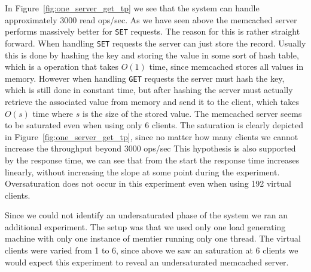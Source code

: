 \documentclass[11pt,a4paper]{article}
\begin{document}
%
In Figure~\ref{fig:one_server_get_tp} we see that the system can handle approximately 3000 read ops/sec.
%
As we have seen above the memcached server performs massively better for \texttt{SET} requests.
%
The reason for this is rather straight forward.
%
When handling \texttt{SET} requests the server can just store the record.
%
Usually this is done by hashing the key and storing the value in some sort of hash table, which is a operation that takes $O(1)$ time, since memcached stores all values in memory.
%
However when handling \texttt{GET} requests the server must hash the key, which is still done in constant time, but after hashing the server must actually retrieve the associated value from memory and send it to the client, which takes $O(s)$ time where $s$ is the size of the stored value.
%
The memcached server seems to be saturated even when using only 6 clients.
%
The saturation is clearly depicted in Figure~\ref{fig:one_server_get_tp}, since no matter how many clients we cannot increase the throughput beyond 3000 ops/sec
%
This hypothesis is also supported by the response time, we can see that from the start the response time increases linearly, without increasing the slope at some point during the experiment.
%
Oversaturation does not occur in this experiment even when using 192 virtual clients.
%
\par
%
Since we could not identify an undersaturated phase of the system we ran an additional experiment.
%
The setup was that we used only one load generating machine with only one instance of memtier running only one thread.
%
The virtual clients were varied from 1 to 6, since above we saw an saturation at 6 clients we would expect this experiment to reveal an undersaturated memcached server.
%
\end{document}
